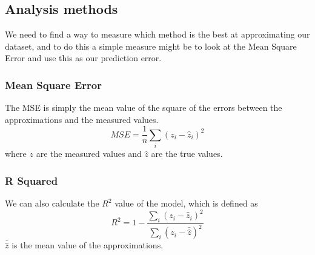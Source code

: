 \documentclass[11pt, A4paper, english]{article}
\begin{document}
\begin{multicols}{2}
			\subsection{Analysis methods}
We need to find a way to measure which method is the best at approximating our dataset, and to do this a simple measure might be to look at the Mean Square Error and use this as our prediction error.
				\subsubsection{Mean Square Error}
The MSE is simply the mean value of the square of the errors between the approximations and the measured values.
				\begin{equation}
MSE = \frac{1}{n} \sum_{i} \left( z_i - \hat{z}_i \right)^2
				\end{equation}
where $z$ are the measured values and $\hat{z}$ are the true values. \\
				\subsubsection{R Squared}
We can also calculate the $R^2$ value of the model, which is defined as
				\begin{equation}
R^2 = 1 - \frac{\sum_{i} \left( z_i - \hat{z}_i \right)^2}{\sum_{i} \left( z_i - \bar{\hat{z}} \right)^2}
				\end{equation}
$\bar{\hat{z}}$ is the mean value of the approximations. \\

\end{multicols}
\end{document}
